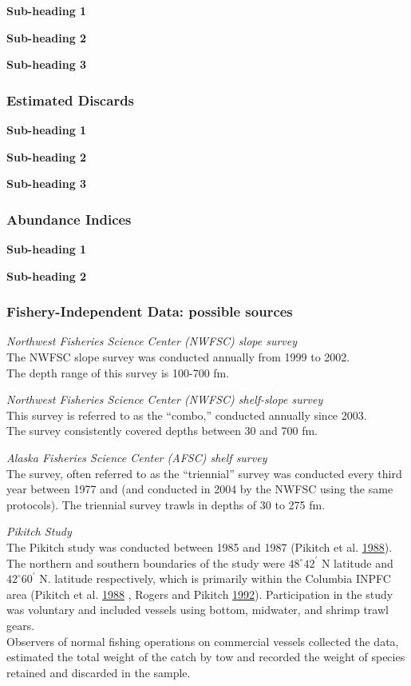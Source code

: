 \documentclass[12pt,]{article}
\begin{document}
\textbf{Sub-heading 1}

\textbf{Sub-heading 2}

\textbf{Sub-heading 3}

\subsubsection{Estimated Discards}\label{estimated-discards}

\textbf{Sub-heading 1}

\textbf{Sub-heading 2}

\textbf{Sub-heading 3}

\subsubsection{Abundance Indices}\label{abundance-indices}

\textbf{Sub-heading 1}

\textbf{Sub-heading 2}

\subsubsection{Fishery-Independent Data: possible
sources}\label{fishery-independent-data-possible-sources}

\emph{Northwest Fisheries Science Center (NWFSC) slope survey}\\
The NWFSC slope survey was conducted annually from 1999 to 2002.\\
The depth range of this survey is 100-700 fm.

\emph{Northwest Fisheries Science Center (NWFSC) shelf-slope survey}\\
This survey is referred to as the ``combo,'' conducted annually since
2003.\\
The survey consistently covered depths between 30 and 700 fm.

\emph{Alaska Fisheries Science Center (AFSC) shelf survey}\\
The survey, often referred to as the ``triennial'' survey was conducted
every third year between 1977 and (and conducted in 2004 by the NWFSC
using the same protocols). The triennial survey trawls in depths of 30
to 275 fm.

\emph{Pikitch Study}\\
The Pikitch study was conducted between 1985 and 1987 (Pikitch et al.
\protect\hyperlink{ref-Pikitch1988}{1988}). The northern and southern
boundaries of the study were \(48^\circ 42^\prime\) N latitude and
\(42^\circ 60^\prime\) N. latitude respectively, which is primarily
within the Columbia INPFC area (Pikitch et al.
\protect\hyperlink{ref-Pikitch1988}{1988} , Rogers and Pikitch
\protect\hyperlink{ref-Rogers1992}{1992}). Participation in the study
was voluntary and included vessels using bottom, midwater, and shrimp
trawl gears.\\
Observers of normal fishing operations on commercial vessels collected
the data, estimated the total weight of the catch by tow and recorded
the weight of species retained and discarded in the sample.
\end{document}
